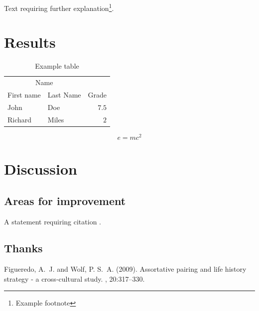 \documentclass[twoside,twocolumn]{article}
\begin{document}
Text requiring further explanation\footnote{Example footnote}.


\section{Results}

\begin{table}
\caption{Example table}
\centering
\begin{tabular}{llr}
\toprule
\multicolumn{2}{c}{Name} \\
\cmidrule(r){1-2}
First name & Last Name & Grade \\
\midrule
John & Doe & $7.5$ \\
Richard & Miles & $2$ \\
\bottomrule
\end{tabular}
\end{table}

\blindtext %

\begin{equation}
\label{eq:emc}
e = mc^2
\end{equation}

\blindtext %


\section{Discussion}

\subsection{Areas for improvement}

A statement requiring citation \cite{Figueredo:2009dg}.
\blindtext %

\subsection{Thanks}

\blindtext %


\begin{thebibliography}{99} %

Figueredo, A.~J. and Wolf, P. S.~A. (2009).
\newblock Assortative pairing and life history strategy - a cross-cultural
  study.
, 20:317--330.
 
\end{thebibliography}

\end{document}
